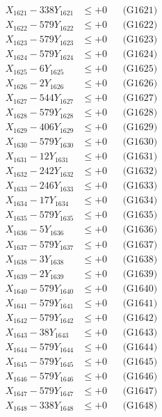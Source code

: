 \documentclass[a4paper,10pt]{article}
\begin{document}
{\begin{align}
\allowbreak
X_{1621} - 338Y_{1621} &\leq +0 && \text{(G1621)} \\
X_{1622} - 579Y_{1622} &\leq +0 && \text{(G1622)} \\
X_{1623} - 579Y_{1623} &\leq +0 && \text{(G1623)} \\
X_{1624} - 579Y_{1624} &\leq +0 && \text{(G1624)} \\
X_{1625} - 6Y_{1625} &\leq +0 && \text{(G1625)} \\
X_{1626} - 2Y_{1626} &\leq +0 && \text{(G1626)} \\
X_{1627} - 544Y_{1627} &\leq +0 && \text{(G1627)} \\
X_{1628} - 579Y_{1628} &\leq +0 && \text{(G1628)} \\
X_{1629} - 406Y_{1629} &\leq +0 && \text{(G1629)} \\
X_{1630} - 579Y_{1630} &\leq +0 && \text{(G1630)} \\
\allowbreak
X_{1631} - 12Y_{1631} &\leq +0 && \text{(G1631)} \\
X_{1632} - 242Y_{1632} &\leq +0 && \text{(G1632)} \\
X_{1633} - 246Y_{1633} &\leq +0 && \text{(G1633)} \\
X_{1634} - 17Y_{1634} &\leq +0 && \text{(G1634)} \\
X_{1635} - 579Y_{1635} &\leq +0 && \text{(G1635)} \\
X_{1636} - 5Y_{1636} &\leq +0 && \text{(G1636)} \\
X_{1637} - 579Y_{1637} &\leq +0 && \text{(G1637)} \\
X_{1638} - 3Y_{1638} &\leq +0 && \text{(G1638)} \\
X_{1639} - 2Y_{1639} &\leq +0 && \text{(G1639)} \\
X_{1640} - 579Y_{1640} &\leq +0 && \text{(G1640)} \\
\allowbreak
X_{1641} - 579Y_{1641} &\leq +0 && \text{(G1641)} \\
X_{1642} - 579Y_{1642} &\leq +0 && \text{(G1642)} \\
X_{1643} - 38Y_{1643} &\leq +0 && \text{(G1643)} \\
X_{1644} - 579Y_{1644} &\leq +0 && \text{(G1644)} \\
X_{1645} - 579Y_{1645} &\leq +0 && \text{(G1645)} \\
X_{1646} - 579Y_{1646} &\leq +0 && \text{(G1646)} \\
X_{1647} - 579Y_{1647} &\leq +0 && \text{(G1647)} \\
X_{1648} - 338Y_{1648} &\leq +0 && \text{(G1648)} \\

\end{align}}
\end{document}
